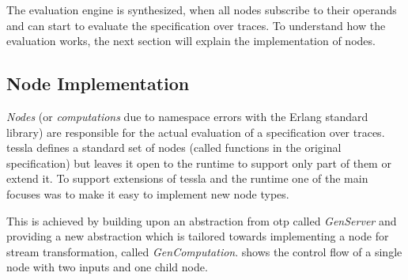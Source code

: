 The evaluation engine is synthesized, when all nodes subscribe to their operands and can start to evaluate the specification over traces.
To understand how the evaluation works, the next section will explain the implementation of nodes.

\subsection{Node Implementation}
\label{sec:implementation:tesslaserver:nodes}

\emph{Nodes} (or \emph{computations} due to namespace errors with the Erlang standard library) are responsible for the actual evaluation of a specification over traces.
\Gls{tessla} defines a standard set of nodes (called functions in the original specification) but leaves it open to the runtime to support only part of them or extend it.
To support extensions of \gls{tessla} and the runtime one of the main focuses was to make it easy to implement new node types.

This is achieved by building upon an abstraction from \gls{otp} called \emph{GenServer} and providing a new abstraction which is tailored towards implementing a node for stream transformation, called \emph{GenComputation}.
 shows the control flow of a single node with two inputs and one child node.

